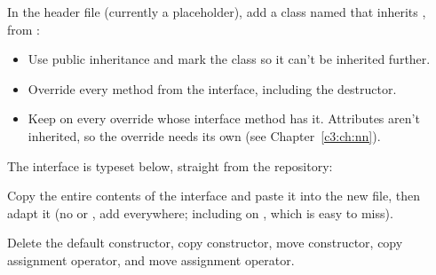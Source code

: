 \label{c8:ex:1}
In the header file  (currently a placeholder), add a class
named  that inherits , from
:
\begin{itemize}
  \item Use public inheritance and mark the class  so it can't be inherited further.
  \item Override every method from the interface, including the destructor.
  \item Keep \code{[[nodiscard]]} on every override whose interface method has it. Attributes
    aren't inherited, so the override needs its own (see Chapter~\ref{c3:ch:nn}).
\end{itemize}
The interface is typeset below, straight from the repository:


\note[Tip] Copy the entire contents of the interface and paste it into the new file, then adapt it
(no  or , add  everywhere; including on
, which is easy to miss).

\label{c8:ex:2}
Delete the default constructor, copy constructor, move constructor, copy assignment operator, and
move assignment operator.

